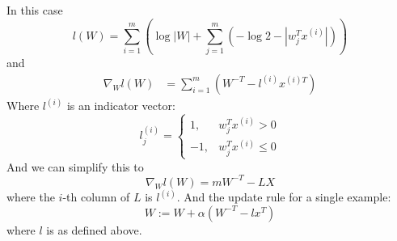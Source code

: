 \begin{answer}
    In this case
$$
l(W) = \sum_{i=1}^m(\log |W| + \sum_{j=1}^m(-\log 2 - |w^T_jx^{(i)}|))
$$
and
$$
\begin{aligned}
\nabla_Wl(W) &= \sum_{i=1}^m (W^{-T} -  l^{(i)}x^{(i)T})
\end{aligned}
$$
Where $l^{(i)}$ is an indicator vector:
$$
l^{(i)}_j = \begin{cases}
1, &w_j^Tx^{(i)} >0\\
-1, &w^T_jx^{(i)}\le 0
\end{cases}
$$
And we can simplify this to
$$
\nabla_Wl(W) = mW^{-T} - LX
$$
where the $i$-th column of $L$ is $l^{(i)}$. And the update rule for a single example:
$$
W:= W + \alpha(W^{-T}  - lx^T)
$$
where $l$ is as defined above.
\end{answer}
